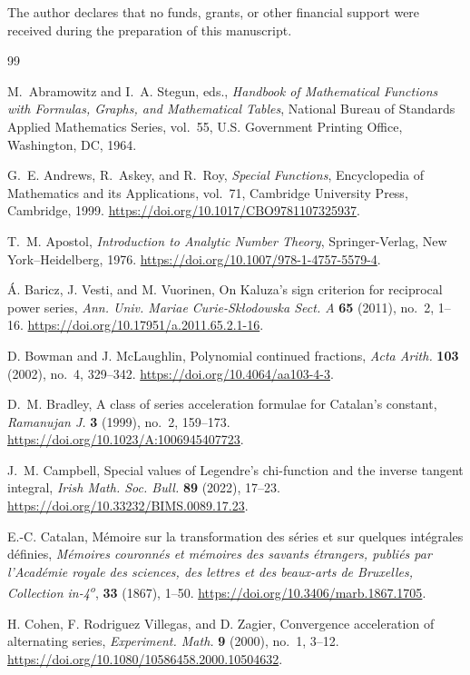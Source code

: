 \documentclass[11pt,reqno]{amsart}
\numberwithin{equation}{section}
\theoremstyle{definition}
\theoremstyle{remark}
\begin{document}
The author declares that no funds, grants, or other financial support
were received during the preparation of this manuscript.
\begin{thebibliography}{99}

M.~Abramowitz and I.~A. Stegun, eds.,
\emph{Handbook of Mathematical Functions with Formulas, Graphs, and
Mathematical Tables},
National Bureau of Standards Applied Mathematics Series, vol.~55,
U.S. Government Printing Office, Washington, DC, 1964.

G.~E. Andrews, R.~Askey, and R.~Roy,
\emph{Special Functions},
Encyclopedia of Mathematics and its Applications, vol.~71,
Cambridge University Press, Cambridge, 1999.
\url{https://doi.org/10.1017/CBO9781107325937}.

T.~M. Apostol,
\emph{Introduction to Analytic Number Theory},
Springer-Verlag, New York--Heidelberg, 1976.
\url{https://doi.org/10.1007/978-1-4757-5579-4}.

\'A. Baricz, J. Vesti, and M. Vuorinen,
On Kaluza's sign criterion for reciprocal power series,
\emph{Ann. Univ. Mariae Curie-Sk{\l}odowska Sect. A}
\textbf{65} (2011), no.~2, 1--16.
\url{https://doi.org/10.17951/a.2011.65.2.1-16}.

D. Bowman and J. McLaughlin,
Polynomial continued fractions,
\emph{Acta Arith.} \textbf{103} (2002), no.~4, 329--342.
\url{https://doi.org/10.4064/aa103-4-3}.

D.~M. Bradley,
A class of series acceleration formulae for Catalan's constant,
\emph{Ramanujan J.} \textbf{3} (1999), no.~2, 159--173.
\url{https://doi.org/10.1023/A:1006945407723}.

J.~M. Campbell,
Special values of Legendre's chi-function and the inverse tangent
integral,
\emph{Irish Math. Soc. Bull.} \textbf{89} (2022), 17--23.
\url{https://doi.org/10.33232/BIMS.0089.17.23}.

E.-C. Catalan,
M\'emoire sur la transformation des s\'eries et sur quelques
int\'egrales d\'efinies,
\emph{M\'emoires couronn\'es et m\'emoires des savants
\'etrangers, publi\'es par l'Acad\'emie royale des sciences,
des lettres et des beaux-arts de Bruxelles, Collection in-4\textsuperscript{o}},
\textbf{33} (1867), 1--50.
\url{https://doi.org/10.3406/marb.1867.1705}.

H. Cohen, F. Rodriguez Villegas, and D. Zagier,
Convergence acceleration of alternating series,
\emph{Experiment. Math.} \textbf{9} (2000), no.~1, 3--12.
\url{https://doi.org/10.1080/10586458.2000.10504632}.


\end{thebibliography}
\end{document}
